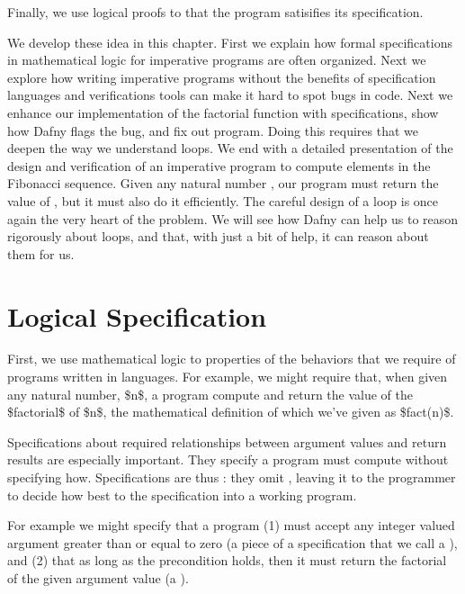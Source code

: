 \documentclass[letterpaper,10pt,english]{sphinxmanual}
\begin{document}
Finally, we use logical proofs to  that the program satisifies
its specification.

We develop these idea in this chapter. First we explain how formal
specifications in mathematical logic for imperative programs are often
organized. Next we explore how writing imperative programs without the
benefits of specification languages and verifications tools can make
it hard to spot bugs in code. Next we enhance our implementation of
the factorial function with specifications, show how Dafny flags the
bug, and fix out program. Doing this requires that we deepen the way
we understand loops. We end with a detailed presentation of the design
and verification of an imperative program to compute elements in the
Fibonacci sequence. Given any natural number , our program must
return the value of , but it must also do it efficiently.  The
careful design of a loop is once again the very heart of the problem.
We will see how Dafny can help us to reason rigorously about loops,
and that, with just a bit of help, it can reason about them for us.


\section{Logical Specification}
\label{\detokenize{05-putting-it-together:logical-specification}}
First, we use mathematical logic to  properties
of the behaviors that we require of programs written in 
languages. For example, we might require that, when given any natural
number, \$n\$, a program compute and return the value of the \$factorial\$
of \$n\$, the mathematical definition of which we’ve given as \$fact(n)\$.

Specifications about required relationships between argument values
and return results are especially important. They specify  a
program must compute without specifying how. Specifications are thus
: they omit , leaving it to the
programmer to decide how best to  the specification into a
working program.

For example we might specify that a program (1) must accept any
integer valued argument greater than or equal to zero (a piece of a
specification that we call a ), and (2) that as long as
the precondition holds, then it must return the factorial of the given
argument value (a ).
\end{document}

